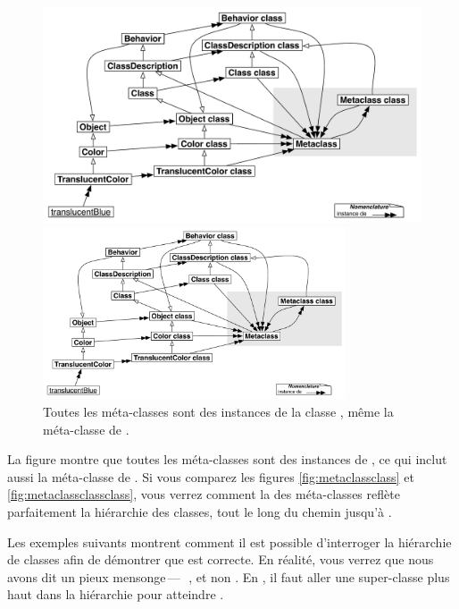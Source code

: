\documentclass[a4paper,10pt,twoside]{book}
\begin{document}
\begin{center}
\begin{figure}
\ifluluelse
	{\centerline{\includegraphics[width=\textwidth]{TranslucentMetaclassClassClass}}}
	{\centerline{\includegraphics[width=0.8\textwidth]{TranslucentMetaclassClassClass}}}
\caption{Toutes les méta-classes sont des instances de la classe ,  même la méta-classe de . }
\end{figure}
\end{center}

La figure montre que toutes les méta-classes sont des instances de , ce qui inclut aussi la méta-classe de .
Si vous comparez les figures \ref{fig:metaclassclass} et \ref{fig:metaclassclassclass}, vous verrez comment la  des méta-classes reflète parfaitement la hiérarchie des classes, tout le long du chemin jusqu'à .


Les exemples suivants montrent comment il est possible d'interroger la hiérarchie de classes afin de démontrer que  est correcte.
En réalité, vous verrez que nous avons dit un pieux mensonge\,---\,\mbox{\ct{-->}~,} et non . En \pharo, il faut aller une super-classe plus haut dans la hiérarchie pour atteindre .
\end{document}
